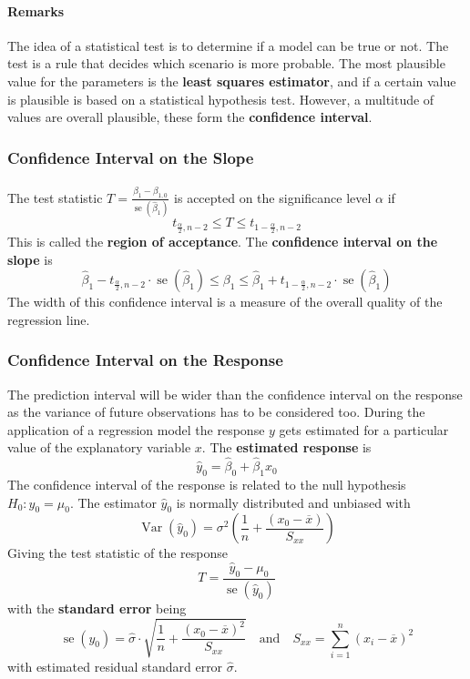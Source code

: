\documentclass[11pt]{article}
\theoremstyle{definition}
\newcommand*\samplemean[1]{\overline{#1}}
\newcommand*\Var[1]{\mathop{\text{Var}}\left(#1\right)}
\newcommand*\se[1]{\mathop{\text{se}}\left(#1\right)}
\begin{document}
\paragraph{Remarks} The idea of a statistical test is to determine if a model can be true or not. The test is a rule that decides which scenario is more probable. The most plausible value for the parameters is the \textbf{least squares estimator}, and if a certain value is plausible is based on a statistical hypothesis test. However, a multitude of values are overall plausible, these form the \textbf{confidence interval}.

\subsubsection{Confidence Interval on the Slope}
The test statistic $ T = \frac{\hat{\beta}_1 - \beta_{1,0}}{\se{\hat{\beta}_1}}$ is accepted on the significance level $\alpha$ if
\begin{equation*}
	t_{\frac{\alpha}{2}, n-2} \leq T \leq t_{1 - \frac{\alpha}{2}, n-2}
\end{equation*}
This is called the \textbf{region of acceptance}. The \textbf{confidence interval on the slope} is
\begin{equation*}
	\hat{\beta}_1 - t_{\frac{\alpha}{2}, n-2}\cdot\se{\hat{\beta}_1} \leq \beta_1 \leq \hat{\beta}_1 + t_{1-\frac{\alpha}{2}, n-2}\cdot\se{\hat{\beta}_1}
\end{equation*}
The width of this confidence interval is a measure of the overall quality of the regression line.

\subsubsection{Confidence Interval on the Response}
The prediction interval will be wider than the confidence interval on the response as the variance of future observations has to be considered too. During the application of a regression model the response $y$ gets estimated for a particular value of the explanatory variable $x$. The \textbf{estimated response} is
\begin{equation*}
	\hat{y}_0 = \hat{\beta}_0 + \hat{\beta}_1 x_0
\end{equation*}
The confidence interval of the response is related to the null hypothesis $H_0: \hat{y}_0 =\mu_0$. The estimator $\hat{y}_0$ is normally distributed and unbiased with
\begin{equation*}
	\Var{\hat{y}_0} = \sigma^2\left(\frac{1}{n} + \frac{(x_0 - \samplemean{x})}{S_{xx}}\right)
\end{equation*}
Giving the test statistic of the response
\begin{equation*}
	T = \frac{\hat{y}_0 - \mu_0}{\se{\hat{y}_0}}
\end{equation*}
with the \textbf{standard error} being
\begin{equation*}
	\se{y_0} = \hat{\sigma} \cdot \sqrt{\frac{1}{n} + \frac{(x_0 - \samplemean{x})^2}{S_{xx}}}\quad\text{and}\quad S_{xx} = \sum_{i=1}^{n}(x_i - \samplemean{x})^2
\end{equation*}
with estimated residual standard error $\hat{\sigma}$.
\end{document}
